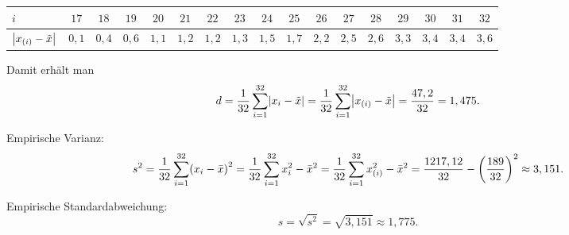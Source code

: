 \documentclass{exercise}
\begin{document}
\begin{enumerate}
\begin{center}
\begin{tabular}{lcccccccccccccccc}
                \bottomrule
            \end{tabular}
            \begin{tabular}{lcccccccccccccccc}
                \toprule
                \(i\) & \(17\) & \(18\) & \(19\) & \(20\) & \(21\) & \(22\) & \(23\) & \(24\) & \(25\) & \(26\) & \(27\) & \(28\) & \(29\) & \(30\) & \(31\) & \(32\)\\
                \midrule
                \(\absolute*{x_{\parentheses*{i}} - \tilde{x}}\) & \(0,1\) & \(0,4\) & \(0,6\) & \(1,1\) & \(1,2\) & \(1,2\) & \(1,3\) & \(1,5\) & \(1,7\) & \(2,2\) & \(2,5\) & \(2,6\) & \(3,3\) & \(3,4\) & \(3,4\) & \(3,6\)\\
                \bottomrule
            \end{tabular}
        \end{center}
        Damit erhält man
        \[
            d = \frac{1}{32}\sum_{i = 1}^{32}\absolute*{x_i - \tilde{x}} = \frac{1}{32}\sum_{i = 1}^{32}\absolute*{x_{\parentheses*{i}} - \tilde{x}} = \frac{47,2}{32} = 1,475.
        \]

        Empirische Varianz:
        \[
            s^2 = \frac{1}{32}\sum_{i = 1}^{32}\parentheses*{x_i - \bar{x}}^2 = \frac{1}{32}\sum_{i = 1}^{32}x_i^2 - \bar{x}^2 = \frac{1}{32}\sum_{i = 1}^{32}x_{\parentheses*{i}}^2 - \bar{x}^2 = \frac{1217,12}{32} - \parentheses*{\frac{189}{32}}^2 \approx 3,151.
        \]

        Empirische Standardabweichung:
        \[
            s = \sqrt{s^2} = \sqrt{3,151} \approx 1,775.
        \]


\end{enumerate}
\end{document}
